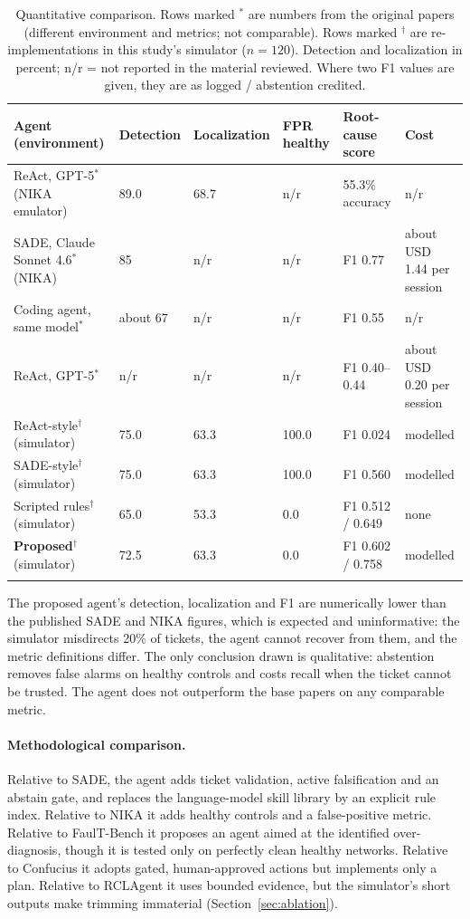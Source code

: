 \documentclass[pdflatex,sn-basic,Numbered,iicol]{sn-jnl}
\begin{document}
\begin{table}[t]
\caption{Quantitative comparison. Rows marked $^{*}$ are numbers from the original papers (different environment and metrics; not comparable). Rows marked $^{\dagger}$ are re-implementations in this study's simulator ($n=120$). Detection and localization in percent; n/r = not reported in the material reviewed. Where two F1 values are given, they are as logged / abstention credited.}\label{tab:quant}
\scriptsize
\begin{tabular}{@{}L{4.2cm}L{1.4cm}L{1.8cm}L{1.5cm}L{2.3cm}L{2.2cm}@{}}
\toprule
Agent (environment) & Detection & Localization & FPR healthy & Root-cause score & Cost \\
\midrule
ReAct, GPT-5$^{*}$ (NIKA emulator) \cite{wang2025nika} & 89.0 & 68.7 & n/r & 55.3\% accuracy & n/r \\
SADE, Claude Sonnet 4.6$^{*}$ (NIKA) \cite{tseng2026sade} & 85 & n/r & n/r & F1 0.77 & about USD 1.44 per session \\
Coding agent, same model$^{*}$ \cite{tseng2026sade} & about 67 & n/r & n/r & F1 0.55 & n/r \\
ReAct, GPT-5$^{*}$ \cite{tseng2026sade} & n/r & n/r & n/r & F1 0.40--0.44 & about USD 0.20 per session \\
\midrule
ReAct-style$^{\dagger}$ (simulator) & 75.0 & 63.3 & 100.0 & F1 0.024 & modelled \\
SADE-style$^{\dagger}$ (simulator) & 75.0 & 63.3 & 100.0 & F1 0.560 & modelled \\
Scripted rules$^{\dagger}$ (simulator) & 65.0 & 53.3 & 0.0 & F1 0.512 / 0.649 & none \\
\textbf{Proposed}$^{\dagger}$ (simulator) & 72.5 & 63.3 & 0.0 & F1 0.602 / 0.758 & modelled \\
\botrule
\end{tabular}
\end{table}

The proposed agent's detection, localization and F1 are numerically lower than the published SADE and NIKA figures, which is expected and uninformative: the simulator misdirects 20\% of tickets, the agent cannot recover from them, and the metric definitions differ. The only conclusion drawn is qualitative: abstention removes false alarms on healthy controls and costs recall when the ticket cannot be trusted. The agent does not outperform the base papers on any comparable metric.

\paragraph{Methodological comparison.} Relative to SADE, the agent adds ticket validation, active falsification and an abstain gate, and replaces the language-model skill library by an explicit rule index. Relative to NIKA it adds healthy controls and a false-positive metric. Relative to FaulT-Bench it proposes an agent aimed at the identified over-diagnosis, though it is tested only on perfectly clean healthy networks. Relative to Confucius it adopts gated, human-approved actions but implements only a plan. Relative to RCLAgent it uses bounded evidence, but the simulator's short outputs make trimming immaterial (Section~\ref{sec:ablation}).
\end{document}
